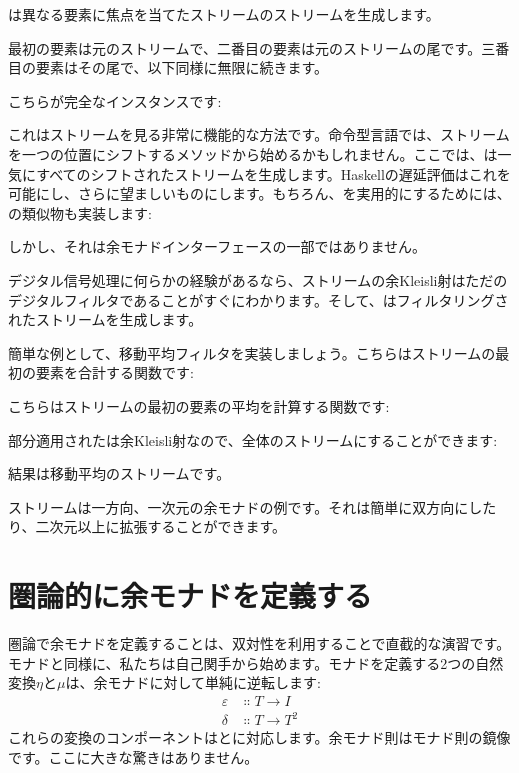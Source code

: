 は異なる要素に焦点を当てたストリームのストリームを生成します。

最初の要素は元のストリームで、二番目の要素は元のストリームの尾です。三番目の要素はその尾で、以下同様に無限に続きます。

こちらが完全なインスタンスです: 

これはストリームを見る非常に機能的な方法です。命令型言語では、ストリームを一つの位置にシフトするメソッドから始めるかもしれません。ここでは、は一気にすべてのシフトされたストリームを生成します。Haskellの遅延評価はこれを可能にし、さらに望ましいものにします。もちろん、を実用的にするためには、の類似物も実装します: 

しかし、それは余モナドインターフェースの一部ではありません。

デジタル信号処理に何らかの経験があるなら、ストリームの余Kleisli射はただのデジタルフィルタであることがすぐにわかります。そして、はフィルタリングされたストリームを生成します。

簡単な例として、移動平均フィルタを実装しましょう。こちらはストリームの最初の要素を合計する関数です: 

こちらはストリームの最初の要素の平均を計算する関数です: 

部分適用されたは余Kleisli射なので、全体のストリームにすることができます: 

結果は移動平均のストリームです。

ストリームは一方向、一次元の余モナドの例です。それは簡単に双方向にしたり、二次元以上に拡張することができます。

\section{圏論的に余モナドを定義する}

圏論で余モナドを定義することは、双対性を利用することで直截的な演習です。モナドと同様に、私たちは自己関手から始めます。モナドを定義する2つの自然変換$\eta$と$\mu$は、余モナドに対して単純に逆転します: 
\begin{align*}
  \varepsilon & \Colon T \to I   \\
  \delta      & \Colon T \to T^2
\end{align*}
これらの変換のコンポーネントはとに対応します。余モナド則はモナド則の鏡像です。ここに大きな驚きはありません。


